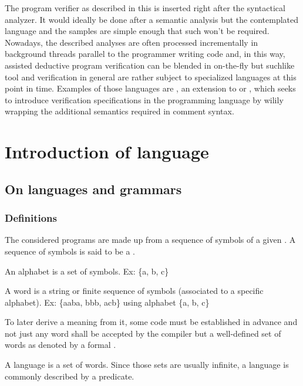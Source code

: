 The program verifier as described in this \paper{} is inserted right after the syntactical analyzer. It would ideally be done after a semantic analysis but the contemplated language and the samples are simple enough that such won't be required. Nowadays, the described analyses are often processed incrementally in background threads parallel to the programmer writing code and, in this way, assisted deductive program verification can be blended in on-the-fly but suchlike tool and verification in general are rather subject to specialized languages at this point in time. Examples of those languages are , an extension to  or , which seeks to introduce verification specifications in the  programming language by wilily wrapping the additional semantics required in comment syntax.

\chapter{Introduction of language}
\label{Introduction of language}

\section{On languages and grammars}\label{sec:lang_grammars}

\subsection{Definitions}
The considered programs are made up from a sequence of symbols of a given . A sequence of symbols is said to be a .

\begin{definition}
	An alphabet is a set of symbols. Ex: \{a, b, c\}
\end{definition}

\begin{definition}
	A word is a string or finite sequence of symbols (associated to a specific alphabet). Ex: \{aaba, bbb, acb\} using alphabet \{a, b, c\}
\end{definition}

To later derive a meaning from it, some code must be established in advance and not just any word shall be accepted by the compiler but a well-defined set of words as denoted by a formal .

\begin{definition}
	A language is a set of words. Since those sets are usually infinite, a language is commonly described by a predicate.
\end{definition}

